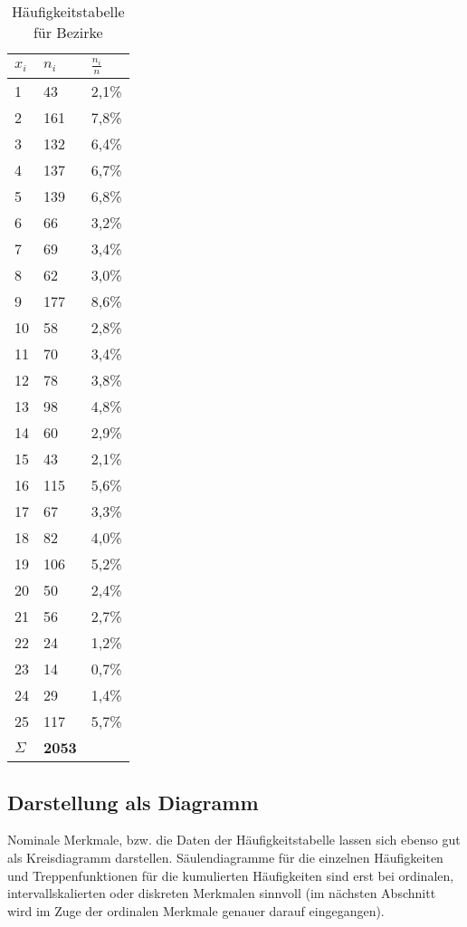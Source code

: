 \begin{table}[h]
\caption{Häufigkeitstabelle für Bezirke} \label{tab:haeufigkeitenBez}
\begin{center}
\begin{tabular}{p{1.25cm}p{1.25cm}p{1.25cm}}
\hline \hline
\textbf{$x_i$} & \textbf{$n_i$} & \textbf{$\frac{n_i}{n}$}\\ 
\hline
1	&	43	&	2,1\% \\
2	&	161	&	7,8\% \\
3	&	132	&	6,4\% \\
4	&	137	&	6,7\% \\
5	&	139	&	6,8\% \\
6	&	66	&	3,2\% \\
7	&	69	&	3,4\% \\
8	&	62	&	3,0\% \\
9	&	177	&	8,6\% \\
10	&	58	&	2,8\% \\
11	&	70	&	3,4\% \\
12	&	78	&	3,8\% \\
13	&	98	&	4,8\% \\
14	&	60	&	2,9\% \\
15	&	43	&	2,1\% \\
16	&	115	&	5,6\% \\
17	&	67	&	3,3\% \\
18	&	82	&	4,0\% \\
19	&	106	&	5,2\% \\
20	&	50	&	2,4\% \\
21	&	56	&	2,7\% \\
22	&	24	&	1,2\% \\
23	&	14	&	0,7\% \\
24	&	29	&	1,4\% \\
25	&	117	&	5,7\% \\
\hline
$\Sigma$ & \textbf{2053}
\end{tabular}
\end{center}
\label{default}
\end{table}%


\subsection{Darstellung als Diagramm}
Nominale Merkmale, bzw. die Daten der Häufigkeitstabelle lassen sich ebenso gut als Kreisdiagramm
darstellen. Säulendiagramme für die einzelnen Häufigkeiten und Treppenfunktionen für die kumulierten
Häufigkeiten sind erst bei ordinalen, intervallskalierten oder diskreten Merkmalen sinnvoll (im
nächsten Abschnitt wird im Zuge der ordinalen Merkmale genauer darauf eingegangen).

